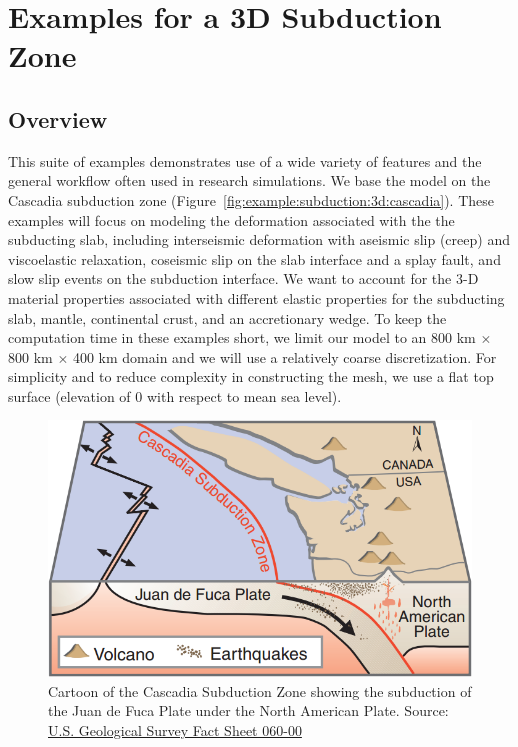 \section{Examples for a 3D Subduction Zone}
\label{sec:example:subduction:3d}

\subsection{Overview}

This suite of examples demonstrates use of a wide variety of features
and the general workflow often used in research simulations. We base
the model on the Cascadia subduction zone
(Figure~\vref{fig:example:subduction:3d:cascadia}). These examples will
focus on modeling the deformation associated with the the subducting
slab, including interseismic deformation with aseismic slip (creep)
and viscoelastic relaxation, coseismic slip on the slab interface and
a splay fault, and slow slip events on the subduction interface. We want
to account for the 3-D material properties associated with different
elastic properties for the subducting slab, mantle, continental crust,
and an accretionary wedge. To keep the computation time in these
examples short, we limit our model to an 800 km $\times$ 800 km
$\times$ 400 km domain and we will use a relatively coarse
discretization. For simplicity and to reduce complexity in constructing
the mesh, we use a flat top surface (elevation of 0 with respect
to mean sea level).

\begin{figure}[htbp]
  \includegraphics[width=4.5in]{examples/figs/subduction3d_cascadia}
  \caption{Cartoon of the Cascadia Subduction Zone showing the
    subduction of the Juan de Fuca Plate under the North American
    Plate. Source:
    \href{https://pubs.usgs.gov/fs/2000/fs060-00/}{U.S. Geological
      Survey Fact Sheet 060-00}}
  \label{fig:example:subduction:3d:cascadia}
\end{figure}

